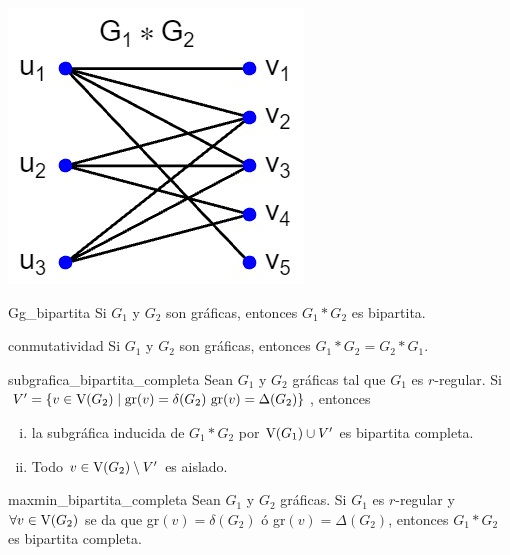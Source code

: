 \documentclass[fleqn, 11pt]{article}
\begin{document}
\begin{ejemplo}[breakable, pad at break = 4mm, beforeafter skip = 3mm]{}{}
\begin{enumerate}
            \begin{center}
                \includegraphics[width=0.3\linewidth]{Ejemplo_1/Ejemplo1_Gg.jpg}
            \end{center}
        \end{enumerate}
    \end{ejemplo}

    \begin{proposicion}[beforeafter skip = 4mm]{}{Gg_bipartita}
        Si $ G_1 $ y $ G_2 $ son gráficas, entonces $ G_1 \ast G_2 $ es bipartita.
    \end{proposicion}

    \begin{proposicion}[beforeafter skip = 4mm]{}{conmutatividad}
            Si $ G_1 $ y $ G_2 $ son gráficas, entonces $ G_1 \ast G_2 = G_2 \ast G_1 $.
        \end{proposicion}

    \begin{teorema}[beforeafter skip = 4mm]{}{subgrafica_bipartita_completa}
        Sean $ G_1 $ y $ G_2 $ gráficas tal que $ G_1 $ es $ r $-regular. Si $ V' = \left\lbrace v \in \textnormal{V}(G_2) \mid \textnormal{gr}(v) = \delta(G_2) \textnormal{ gr}(v) = \Delta(G_2) \right\rbrace $, entonces \vspace{3mm}
        
        \begin{enumerate}[i)]
            \item la subgráfica inducida de $ G_1 \ast G_2 $ por $ \textnormal{V}(G_1) \cup V' $ es bipartita completa.
            \item Todo $ v \in \textnormal{V}(G_2) \setminus V' $ es aislado.
        \end{enumerate}
    \end{teorema}

    \begin{corolario}[beforeafter skip = 4mm]{}{maxmin_bipartita_completa}
        Sean $ G_1 $ y $ G_2 $ gráficas. Si $ G_1 $ es $ r $-regular y $ \forall v \in \textnormal{V}(G_2) $ se da que gr$(v) = \delta(G_2) $ ó gr$(v) = \Delta(G_2) $, entonces $ G_1 \ast G_2 $ es bipartita completa.
    \end{corolario}
\end{document}
